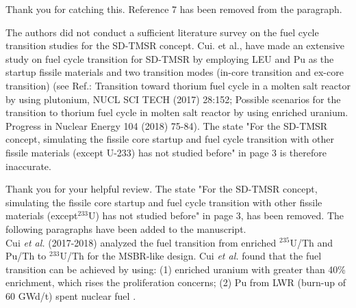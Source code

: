 \documentclass[answers,11pt]{exam}
\begin{document}
\begin{questions}
\begin{solution}
                 Thank you for catching this. Reference 7 has been removed from the paragraph.
                 
        \end{solution}


        \question The authors did not conduct a sufficient literature survey on the fuel cycle transition studies for the SD-TMSR concept. Cui. et al., have made an extensive study on fuel cycle transition for SD-TMSR by employing LEU and Pu as the startup fissile materials and two transition modes (in-core transition and ex-core transition) (see Ref.: Transition toward thorium fuel cycle in a molten salt reactor by using plutonium, NUCL SCI TECH (2017) 28:152; Possible scenarios for the transition to thorium fuel cycle in molten salt reactor by using enriched uranium. Progress in Nuclear Energy 104 (2018) 75-84). The state "For the SD-TMSR concept, simulating the fissile core startup and fuel cycle transition with other fissile materials (except U-233) has not studied before" in page 3 is therefore inaccurate.
        \begin{solution}
                Thank you for your helpful review. The state "For the SD-TMSR 
                concept, simulating the fissile core startup and fuel cycle 
                transition with other fissile materials (except$^{233}$U) has 
                not studied before" in page 3, has been removed. 
                The following paragraphs have been added to the manuscript.\\
                
                Cui \emph{et al.} (2017-2018) analyzed the fuel transition from enriched $^{235}$U/Th and Pu/Th to $^{233}$U/Th for the MSBR-like design. Cui \emph{et al.} found that the fuel transition can be achieved by using: (1) enriched uranium with greater than 40\% enrichment, which rises the proliferation concerns; (2) Pu from LWR (burn-up of 60 GWd/t) spent nuclear fuel \cite{cui2017transition,cui2018possible}.
                

\end{solution}
\end{questions}
\end{document}

